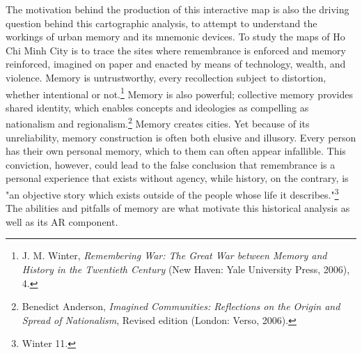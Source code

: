 The motivation behind the production of this interactive map is also the driving question behind this cartographic analysis, to  attempt to understand the workings of urban memory and its mnemonic devices. To study the maps of Ho Chi Minh City is to trace the sites where remembrance is enforced and memory reinforced, imagined on paper and enacted by means of technology,  wealth, and violence. Memory is untrustworthy, every recollection subject to distortion, whether intentional or not.\footnote{J. M. Winter, \textit{Remembering War: The Great War between Memory and History in the Twentieth Century} (New Haven: Yale University Press, 2006), 4.} Memory is also powerful; collective memory provides shared identity, which enables concepts and ideologies as compelling as nationalism and regionalism.\footnote{Benedict Anderson, \textit{Imagined Communities: Reflections on the Origin and Spread of Nationalism}, Revised edition (London: Verso, 2006).} Memory creates cities. Yet because of its unreliability, memory construction is often both elusive and illusory. Every person has their own personal memory, which to them can often appear infallible. This conviction, however, could lead to the false conclusion that remembrance is a personal experience that exists without agency, while history, on the contrary, is "an objective story which exists outside of the people whose life it describes."\footnote{Winter 11.} The abilities and pitfalls of memory are what motivate this historical analysis as well as its AR component.
